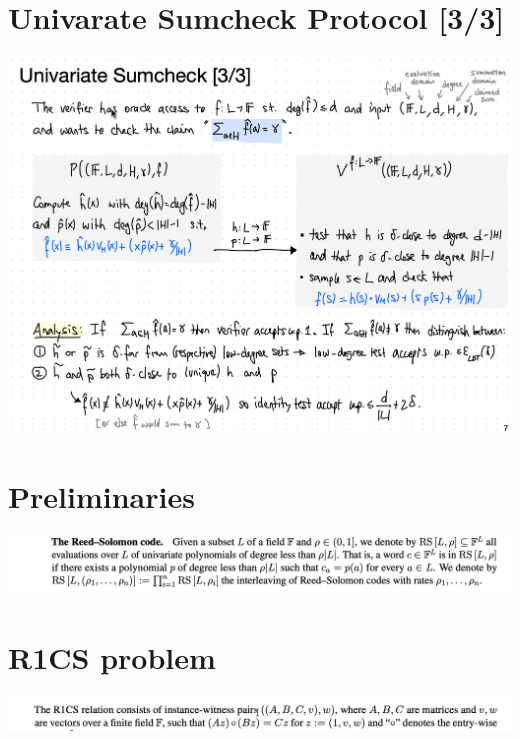 \documentclass{beamer}
\begin{document}
\section{Univarate Sumcheck Protocol [3/3]}



\begin{frame}{}
	\begin{minipage}{0.42\linewidth}
		\includegraphics[scale=0.25]{u3.png}
	\end{minipage}
\end{frame}

\section{Preliminaries}

\begin{frame}{}
\begin{minipage}{0.42\linewidth}
	\includegraphics[scale=0.30]{t7.png}
\end{minipage}
\end{frame}



\section{R1CS problem}


\begin{frame}{}
	\begin{minipage}{0.42\linewidth}
		\includegraphics[scale=0.30]{t8.png}
	\end{minipage}
\end{frame}
\end{document}
